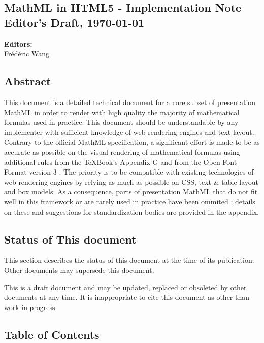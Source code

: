 \subsection*{MathML in HTML5 - Implementation Note\\Editor's Draft, \today}

\textbf{Editors:} \\
Frédéric Wang

\subsection*{Abstract}

This document is a detailed technical document for a core subset of presentation
MathML \cite{MathML3} in order to render with high quality the majority of
mathematical formulas used in practice.
This document should be understandable by any implementer with
sufficient knowledge of web rendering engines and text layout.
Contrary to the official MathML specification, a significant effort is made to
be as accurate as possible on the visual rendering of mathematical formulas
using additional rules from the \TeX Book's Appendix G \cite{TeXBook} and from
the Open Font Format version 3 \cite{OpenFontFormat3}.
The priority is to be compatible with existing technologies of web
rendering engines \cite{HTML5} by relying as much as possible on CSS, text \&
table layout and box models. As a consequence, parts of presentation MathML
that do not fit well in this framework or are rarely used in practice
have been ommited ; details on these and suggestions for standardization bodies
are provided in the appendix.

\subsection*{Status of This document}

This section describes the status of this document at the time of its
publication. Other documents may supersede this document.

This is a draft document and may be updated, replaced or obsoleted by other
documents at any time. It is inappropriate to cite this document as other than
work in progress.

\subsection*{Table of Contents}

\renewcommand\contentsname{}
\tableofcontents
